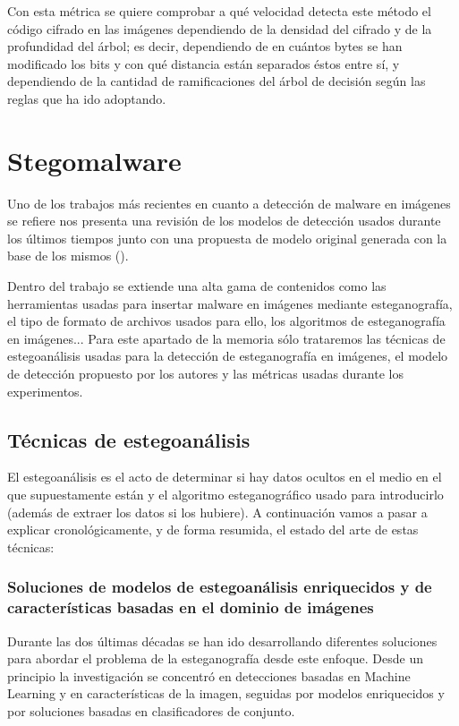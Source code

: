 Con esta métrica se quiere comprobar a qué velocidad detecta este método el código cifrado en las imágenes dependiendo de la densidad del cifrado y de la profundidad del árbol; es decir, dependiendo de en cuántos bytes se han modificado los bits y con qué distancia están separados éstos entre sí, y dependiendo de la cantidad de ramificaciones del árbol de decisión según las reglas que ha ido adoptando.

\section{Stegomalware}
\label{sec:stegomalware}

Uno de los trabajos más recientes en cuanto a detección de malware en imágenes se refiere nos presenta una revisión de los modelos de detección usados durante los últimos tiempos junto con una propuesta de modelo original generada con la base de los mismos (\cite{stegomalware}). %

Dentro del trabajo se extiende una alta gama de contenidos como las herramientas usadas para insertar malware en imágenes mediante esteganografía, el tipo de formato de archivos usados para ello, los algoritmos de esteganografía en imágenes... Para este apartado de la memoria sólo trataremos las técnicas de estegoanálisis usadas para la detección de esteganografía en imágenes, el modelo de detección propuesto por los autores y las métricas usadas durante los experimentos.

\subsection{Técnicas de estegoanálisis}

El estegoanálisis es el acto de determinar si hay datos ocultos en el medio en el que supuestamente están y el algoritmo esteganográfico usado para introducirlo (además de extraer los datos si los hubiere). A continuación vamos a pasar a explicar cronológicamente, y de forma resumida, el estado del arte de estas técnicas:

\subsubsection{Soluciones de modelos de estegoanálisis enriquecidos y de características basadas en el dominio de imágenes}

Durante las dos últimas décadas se han ido desarrollando diferentes soluciones para abordar el problema de la esteganografía desde este enfoque. Desde un principio la investigación se concentró en detecciones basadas en Machine Learning y en características de la imagen, seguidas por modelos enriquecidos y por soluciones basadas en clasificadores de conjunto. 

